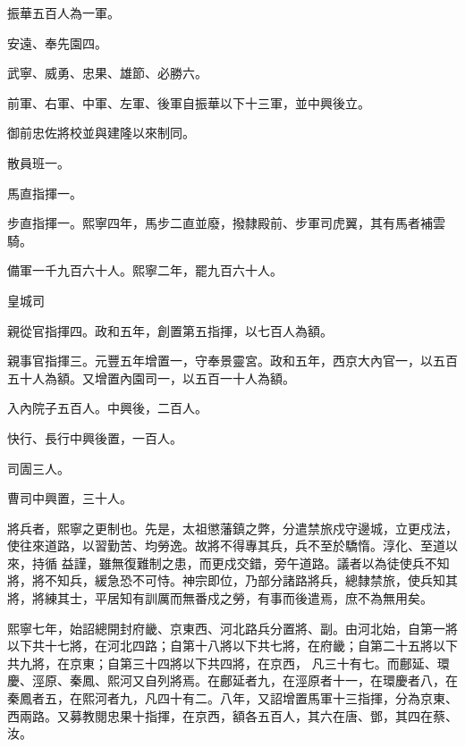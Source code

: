 \begin{pinyinscope}
 振華五百人為一軍。



 安遠、奉先園四。



 武寧、威勇、忠果、雄節、必勝六。



 前軍、右軍、中軍、左軍、後軍自振華以下十三軍，並中興後立。



 御前忠佐將校並與建隆以來制同。



 散員班一。



 馬直指揮一。



 步直指揮一。熙寧四年，馬步二直並廢，撥隸殿前、步軍司虎翼，其有馬者補雲
 騎。



 備軍一千九百六十人。熙寧二年，罷九百六十人。



 皇城司



 親從官指揮四。政和五年，創置第五指揮，以七百人為額。



 親事官指揮三。元豐五年增置一，守奉景靈宮。政和五年，西京大內官一，以五百五十人為額。又增置內園司一，以五百一十人為額。



 入內院子五百人。中興後，二百人。



 快行、長行中興後置，一百人。



 司圊三人。



 曹司中興置，三十人。



 將兵者，熙寧之更制也。先是，太祖懲藩鎮之弊，分遣禁旅戍守邊城，立更戍法，使往來道路，以習勤苦、均勞逸。故將不得專其兵，兵不至於驕惰。淳化、至道以來，持循
 益謹，雖無復難制之患，而更戍交錯，旁午道路。議者以為徒使兵不知將，將不知兵，緩急恐不可恃。神宗即位，乃部分諸路將兵，總隸禁旅，使兵知其將，將練其士，平居知有訓厲而無番戍之勞，有事而後遣焉，庶不為無用矣。



 熙寧七年，始詔總開封府畿、京東西、河北路兵分置將、副。由河北始，自第一將以下共十七將，在河北四路；自第十八將以下共七將，在府畿；自第二十五將以下共九將，在京東；自第三十四將以下共四將，在京西，
 凡三十有七。而鄜延、環慶、涇原、秦鳳、熙河又自列將焉。在鄜延者九，在涇原者十一，在環慶者八，在秦鳳者五，在熙河者九，凡四十有二。八年，又詔增置馬軍十三指揮，分為京東、西兩路。又募教閱忠果十指揮，在京西，額各五百人，其六在唐、鄧，其四在蔡、汝。




\end{pinyinscope}
